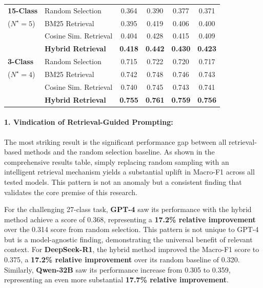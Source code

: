 \begin{table}[H]
\begin{tabular}{@{}llcccc@{}}
    \midrule
    \textbf{15-Class} & Random Selection & 0.364 & 0.390 & 0.377 & 0.371 \\
    ($N^\star=5$)     & BM25 Retrieval             & 0.395 & 0.419 & 0.406 & 0.400 \\
                      & Cosine Sim. Retrieval      & 0.404 & 0.428 & 0.415 & 0.409 \\
                      & \textbf{Hybrid Retrieval}  & \textbf{0.418} & \textbf{0.442} & \textbf{0.430} & \textbf{0.423} \\
    \midrule
    \textbf{3-Class}  & Random Selection & 0.715 & 0.722 & 0.720 & 0.717 \\
    ($N^\star=4$)     & BM25 Retrieval             & 0.742 & 0.748 & 0.746 & 0.743 \\
                      & Cosine Sim. Retrieval      & 0.740 & 0.745 & 0.743 & 0.741 \\
                      & \textbf{Hybrid Retrieval}  & \textbf{0.755} & \textbf{0.761} & \textbf{0.759} & \textbf{0.756} \\
    \bottomrule
  \end{tabular}
\end{table}

\paragraph{1. Vindication of Retrieval-Guided Prompting:}
The most striking result is the significant performance gap between all retrieval-based methods and the random selection baseline. As shown in the comprehensive results table, simply replacing random sampling with an intelligent retrieval mechanism yields a substantial uplift in Macro-F1 across all tested models. This pattern is not an anomaly but a consistent finding that validates the core premise of this research.

For the challenging 27-class task, \textbf{GPT-4} saw its performance with the hybrid method achieve a score of 0.368, representing a \textbf{17.2\% relative improvement} over the 0.314 score from random selection. This pattern is not unique to GPT-4 but is a model-agnostic finding, demonstrating the universal benefit of relevant context. For \textbf{DeepSeek-R1}, the hybrid method improved the Macro-F1 score to 0.375, a \textbf{17.2\% relative improvement} over its random baseline of 0.320. Similarly, \textbf{Qwen-32B} saw its performance increase from 0.305 to 0.359, representing an even more substantial \textbf{17.7\% relative improvement}.

